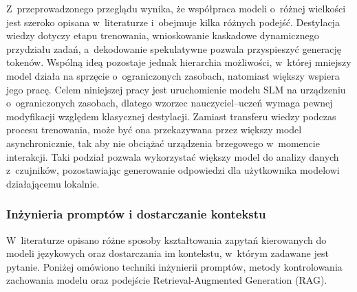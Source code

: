 Z~przeprowadzonego przeglądu wynika, że współpraca modeli o~różnej wielkości jest szeroko opisana w~literaturze i~obejmuje kilka różnych podejść. Destylacja wiedzy dotyczy etapu trenowania, wnioskowanie kaskadowe dynamicznego przydziału zadań, a~dekodowanie spekulatywne pozwala przyspieszyć generację tokenów. Wspólną ideą pozostaje jednak hierarchia możliwości, w~której mniejszy model działa na sprzęcie o~ograniczonych zasobach, natomiast większy wspiera jego pracę. Celem niniejszej pracy jest uruchomienie modelu SLM na urządzeniu o~ograniczonych zasobach, dlatego wzorzec nauczyciel--uczeń wymaga pewnej modyfikacji względem klasycznej destylacji. Zamiast transferu wiedzy podczas procesu trenowania, może być ona przekazywana przez większy model asynchronicznie, tak aby nie obciążać urządzenia brzegowego w~momencie interakcji. Taki podział pozwala wykorzystać większy model do analizy danych z~czujników, pozostawiając generowanie odpowiedzi dla użytkownika modelowi działającemu lokalnie.

\subsubsection{Inżynieria promptów i dostarczanie kontekstu}

W~literaturze opisano różne sposoby kształtowania zapytań kierowanych do modeli językowych oraz dostarczania im kontekstu, w~którym zadawane jest pytanie. Poniżej omówiono techniki inżynierii promptów, metody kontrolowania zachowania modelu oraz podejście Retrieval-Augmented Generation (RAG).

